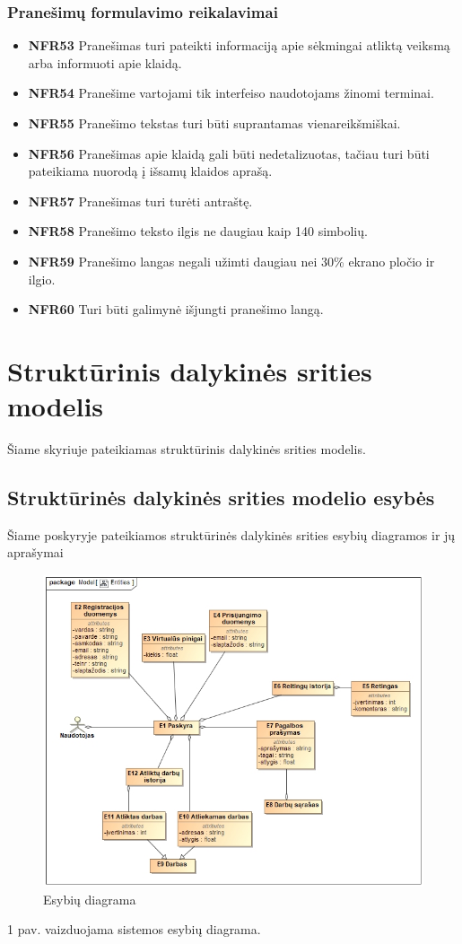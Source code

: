 \documentclass{VUMIFPSbakalaurinis}
\begin{document}
\subsubsection{Pranešimų formulavimo reikalavimai}
\begin{itemize}
	\item \textbf{NFR53} Pranešimas turi pateikti informaciją apie sėkmingai atliktą veiksmą arba informuoti apie klaidą.
	\item \textbf{NFR54} Pranešime vartojami tik interfeiso naudotojams žinomi terminai.
	\item \textbf{NFR55} Pranešimo tekstas turi būti suprantamas vienareikšmiškai.
	\item \textbf{NFR56} Pranešimas apie klaidą gali būti nedetalizuotas, tačiau turi būti pateikiama nuorodą į išsamų klaidos aprašą.
	\item \textbf{NFR57} Pranešimas turi turėti antraštę.
	\item \textbf{NFR58} Pranešimo teksto ilgis ne daugiau kaip 140 simbolių.
	\item \textbf{NFR59} Pranešimo langas negali užimti daugiau nei 30\% ekrano pločio ir ilgio.
	\item \textbf{NFR60} Turi būti galimynė išjungti pranešimo langą.
\end{itemize}

\section{Struktūrinis dalykinės srities modelis}
Šiame skyriuje pateikiamas struktūrinis dalykinės srities modelis.
\subsection {Struktūrinės dalykinės srities modelio esybės}
Šiame poskyryje pateikiamos struktūrinės dalykinės srities esybių diagramos ir jų aprašymai
\begin{figure}[H]
	\centering
	\includegraphics[scale=0.7]{img/Entities}
	\caption{Esybių diagrama}
	\label{img:entities}
\end{figure}
1 pav. vaizduojama sistemos esybių diagrama.
\end{document}

